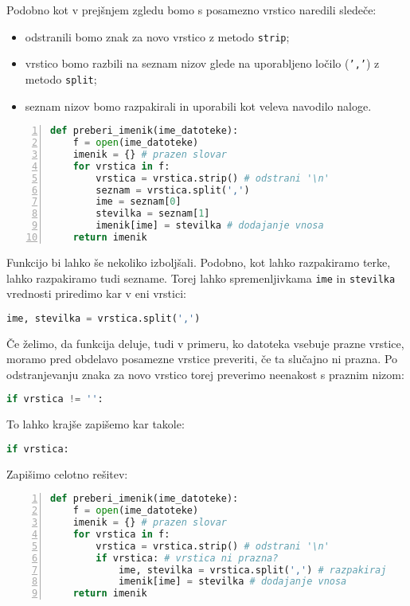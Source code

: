 \begin{resitev}
Podobno kot v prejšnjem zgledu bomo s posamezno vrstico naredili sledeče:
\begin{itemize}
    \item odstranili bomo znak za novo vrstico z metodo \texttt{strip};
    \item vrstico bomo razbili na seznam nizov glede na uporabljeno ločilo (\texttt{','}) z metodo \texttt{split};
    \item seznam nizov bomo razpakirali in uporabili kot veleva navodilo naloge.
\end{itemize}

\begin{lstlisting}[language=Python, showstringspaces=false,numbers=left]
def preberi_imenik(ime_datoteke):
    f = open(ime_datoteke)
    imenik = {} # prazen slovar
    for vrstica in f:
        vrstica = vrstica.strip() # odstrani '\n'
        seznam = vrstica.split(',')
        ime = seznam[0]
        stevilka = seznam[1]
        imenik[ime] = stevilka # dodajanje vnosa
    return imenik
\end{lstlisting}
Funkcijo bi lahko še nekoliko izboljšali. Podobno, kot lahko razpakiramo terke, lahko razpakiramo tudi sezname. Torej lahko spremenljivkama \texttt{ime} in \texttt{stevilka} vrednosti priredimo kar v eni vrstici:
\begin{lstlisting}[language=Python, showstringspaces=false]
ime, stevilka = vrstica.split(',')
\end{lstlisting}
Če želimo, da funkcija deluje, tudi v primeru, ko datoteka vsebuje prazne vrstice, moramo pred obdelavo posamezne vrstice preveriti, če ta slučajno ni prazna. Po odstranjevanju znaka za novo vrstico torej preverimo neenakost s praznim nizom:
\begin{lstlisting}[language=Python, showstringspaces=false]
if vrstica != '':
\end{lstlisting}
To lahko krajše zapišemo kar takole:
\begin{lstlisting}[language=Python, showstringspaces=false]
if vrstica:
\end{lstlisting}
Zapišimo celotno rešitev:
\begin{lstlisting}[language=Python, showstringspaces=false,numbers=left]
def preberi_imenik(ime_datoteke):
    f = open(ime_datoteke)
    imenik = {} # prazen slovar
    for vrstica in f:
        vrstica = vrstica.strip() # odstrani '\n'
        if vrstica: # vrstica ni prazna?
            ime, stevilka = vrstica.split(',') # razpakiraj
            imenik[ime] = stevilka # dodajanje vnosa
    return imenik
\end{lstlisting}
\end{resitev}


